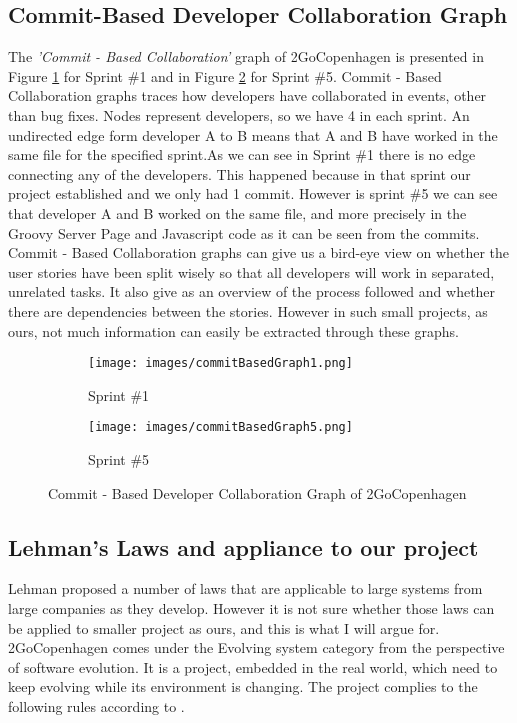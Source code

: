 \subsection{Commit-Based Developer Collaboration Graph}
The \emph{'Commit - Based Collaboration'} graph of 2GoCopenhagen is presented in Figure \ref{CommitBased1} for Sprint \#1 and in Figure \ref{CommitBased5} for Sprint \#5.
Commit - Based Collaboration graphs traces how developers have collaborated in events, other than bug fixes. Nodes represent developers, so we have 4 in each sprint. An undirected edge form developer A to B means that A and B have worked in the same file for the specified sprint.As we can see in Sprint \#1 there is no edge connecting any of the developers. This happened because in that sprint our project established and we only had 1 commit. However is sprint \#5 we can see that developer A and B worked on the same file, and more precisely in the Groovy Server Page and Javascript code as it can be seen from the commits.
Commit - Based Collaboration graphs can give us a bird-eye view on whether the user stories have been split wisely so that all developers will work in separated, unrelated tasks. It also give as an overview of the process followed and whether there are dependencies between the stories. However in such small projects, as ours, not much information can easily be extracted through these graphs.
\begin{figure}[H]
        \centering
        \begin{subfigure}[H]{0.2\textwidth}
                \texttt{[image: images/commitBasedGraph1.png]}
                \caption{Sprint \#1}
                \label{CommitBased1}
        \end{subfigure}%
        \begin{subfigure}[H]{0.2\textwidth}
                \texttt{[image: images/commitBasedGraph5.png]}
                \caption{Sprint \#5}
                \label{CommitBased5}
        \end{subfigure}
        \caption{Commit - Based Developer Collaboration Graph of 2GoCopenhagen}\label{CommitBasedGraph}
\end{figure}


\subsection{Lehman's Laws and appliance to our project}

Lehman proposed a number of laws that are applicable to large systems from large companies as they develop. However it is not sure whether those laws can be applied to smaller project as ours, and this is what I will argue for. 2GoCopenhagen comes under the Evolving system category from the perspective of software evolution. It is a project, embedded in the real world, which need to keep evolving while its environment is changing. The project complies to the following rules according to \cite{Lehman}.


